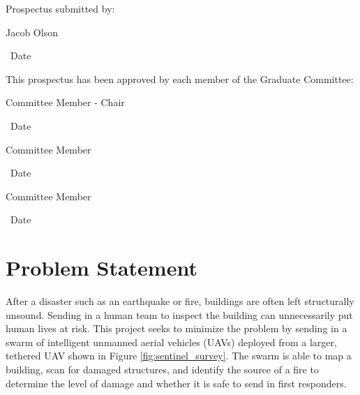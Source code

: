 \documentclass[12pt, letterpaper]{article}
\begin{document}
\hspace*{.47in}
\begin{minipage}[c]{5.25in}

\normalsize

Prospectus submitted by:

\vspace{.5in}

\makebox[2in]{\hrulefill} \hspace{1in} \makebox[2in]{\hrulefill}

\parbox[b]{3in}{Jacob Olson} \, Date
\vspace{0.5in}

This prospectus has been approved by each member of the Graduate Committee:
\vspace{0.5in}

\makebox[2in]{\hrulefill} \hspace{1in} \makebox[2in]{\hrulefill}

\parbox[b]{3in}{Committee Member - Chair} \, Date
\vspace{0.4in}

\makebox[2in]{\hrulefill} \hspace{1in} \makebox[2in]{\hrulefill}

\parbox[b]{3in}{Committee Member} \, Date
\vspace{0.4in}

\makebox[2in]{\hrulefill} \hspace{1in} \makebox[2in]{\hrulefill}

\parbox[b]{3in}{Committee Member} \, Date

\end{minipage}

\vspace*{\fill}

\pagebreak

\setcounter{page}{1}

\section{Problem Statement}
After a disaster such as an earthquake or fire, buildings are often left structurally unsound. Sending in a human team to inspect the building can unnecessarily put human lives at risk. This project seeks to minimize the problem by sending in a swarm of intelligent unmanned aerial vehicles (UAVs) deployed from a larger, tethered UAV shown in Figure \ref{fig:sentinel_survey}. The swarm is able to map a building, scan for damaged structures, and identify the source of a fire to determine the level of damage and whether it is safe to send in first responders.
\end{document}
